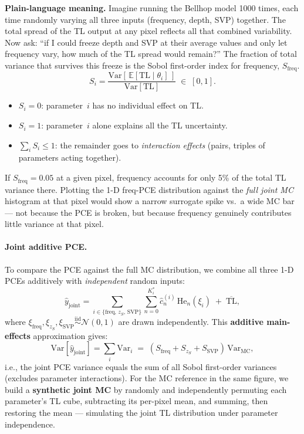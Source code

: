 \documentclass[11pt,a4paper]{article}
\newcommand{\TL}{\mathrm{TL}}
\begin{document}
\textbf{Plain-language meaning.} Imagine running the Bellhop model 1000 times, each time
randomly varying all three inputs (frequency, depth, SVP) together.  The total spread of
the TL output at any pixel reflects all that combined variability.  Now ask: ``if I could
freeze depth and SVP at their average values and only let frequency vary, how much of the
TL spread would remain?''  The fraction of total variance that survives this freeze is the
Sobol first-order index for frequency, $S_\mathrm{freq}$.
\begin{equation}
  S_i = \frac{\mathrm{Var}[\,\mathbb{E}[\TL \mid \theta_i]\,]}{\mathrm{Var}[\TL]}
  \;\in\; [0, 1].
  \label{eq:sobol}
\end{equation}
\begin{itemize}
  \item $S_i = 0$: parameter~$i$ has no individual effect on TL.
  \item $S_i = 1$: parameter~$i$ alone explains all the TL uncertainty.
  \item $\sum_i S_i \leq 1$: the remainder goes to \emph{interaction effects} (pairs,
        triples of parameters acting together).
\end{itemize}

If $S_\mathrm{freq} = 0.05$ at a given pixel, frequency accounts for only 5\% of the
total TL variance there.  Plotting the 1-D freq-PCE distribution against the
\emph{full joint MC} histogram at that pixel would show a narrow surrogate spike
vs.\ a wide MC bar --- not because the PCE is broken, but because frequency genuinely
contributes little variance at that pixel.

\paragraph{Joint additive PCE.}
To compare the PCE against the full MC distribution, we combine all three 1-D PCEs
additively with \emph{independent} random inputs:
\begin{equation}
  \hat{y}_\mathrm{joint} = \sum_{i \in \{\mathrm{freq},\,z_S,\,\mathrm{SVP}\}}
    \sum_{n=0}^{K^*_i} \hat{c}_{n}^{(i)}\,\mathrm{He}_n(\xi_i)
    \;+\; \overline{\TL},
  \label{eq:pce_joint}
\end{equation}
where $\xi_\mathrm{freq},\xi_{z_S},\xi_\mathrm{SVP} \overset{\mathrm{iid}}{\sim} \mathcal{N}(0,1)$
are drawn independently.  This \textbf{additive main-effects} approximation gives:
\begin{equation}
  \mathrm{Var}[\hat{y}_\mathrm{joint}] = \sum_i \mathrm{Var}_i \;=\;
  (S_\mathrm{freq} + S_{z_S} + S_\mathrm{SVP})\,\mathrm{Var}_\mathrm{MC},
  \label{eq:pce_joint_var}
\end{equation}
i.e., the joint PCE variance equals the sum of all Sobol first-order variances
(excludes parameter interactions).  For the MC reference in the same figure,
we build a \textbf{synthetic joint MC} by randomly and independently permuting each
parameter's TL cube, subtracting its per-pixel mean, and summing, then restoring the
mean --- simulating the joint TL distribution under parameter independence.
\end{document}

